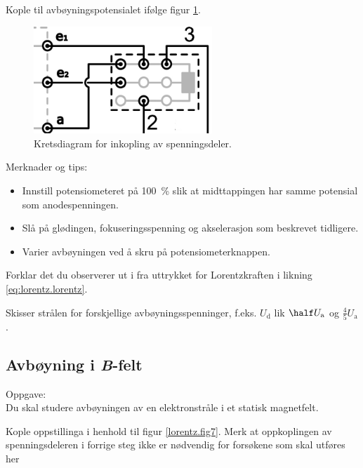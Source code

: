 \documentclass[../Elmag-labhefte-2020.tex]{subfiles}
\begin{document}
{\itsf Kople til avbøyningspotensialet ifølge figur \ref{fig:spenningsdeler}.}
 
\begin{figure}[!ht]
    \begin{center}
    \includegraphics[width=0.6\textwidth]{fig/spenningsdeler-new.pdf}
    \caption{%
        Kretsdiagram for inkopling av spenningsdeler.
    }
    \label{fig:spenningsdeler}
    \end{center}
\end{figure}

Merknader og tips:
\vspace{-4mm} 
\begin{itemize}
    \item Innstill potensiometeret på \SI{100}{\percent} slik at midttappingen har samme potensial som anodespenningen.
    \item Slå på glødingen, fokuseringsspenning og akselerasjon som beskrevet tidligere.
    \item Varier avbøyningen ved å skru på potensiometerknappen.
\end{itemize}

{\itsf Forklar det du observerer ut i fra uttrykket for Lorentzkraften i likning \eqref{eq:lorentz.lorentz}. 

Skisser strålen for forskjellige avbøyningsspenninger, f.eks. $U_\mathrm{d}$ lik $\half  U_\mathrm{a}$ og $\frac{4}{5} U_\mathrm{a}$.
}

 
\subsection{Avbøyning i \textsl{B}-felt}

Oppgave:\\
{\itsf Du skal studere avbøyningen av en elektronstråle i et statisk magnetfelt.}


{\itsf Kople oppstillinga i henhold til figur \ref{lorentz.fig7}.  Merk at oppkoplingen av spenningsdeleren i forrige steg ikke er nødvendig for forsøkene som skal utføres her}
\end{document}
